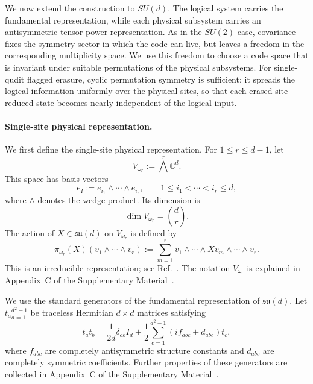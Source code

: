 \documentclass[10pt,twocolumn,superscriptaddress,aps,amsmath,amssymb,citeautoscript,floatfix,prx,longbibliography]{revtex4-2}
\theoremstyle{plain}
\theoremstyle{plain}
\theoremstyle{plain}
\theoremstyle{plain}
\theoremstyle{plain}
\theoremstyle{plain}
\begin{document}
We now extend the construction to $SU(d)$. The logical system carries the fundamental representation, while each physical subsystem carries an antisymmetric tensor-power representation. As in the $SU(2)$ case, covariance fixes the symmetry sector in which the code can live, but leaves a freedom in the corresponding multiplicity space. We use this freedom to choose a code space that is invariant under suitable permutations of the physical subsystems. For single-qudit flagged erasure, cyclic permutation symmetry is sufficient: it spreads the logical information uniformly over the physical sites, so that each erased-site reduced state becomes nearly independent of the logical input.

\paragraph{Single-site physical representation.}

We first define the single-site physical representation. For $1\le r\le d-1$, let
\begin{equation}\label{eq:vomegar_def}
V_{\omega_r}:=\bigwedge^r \mathbb C^d .
\end{equation}
This space has basis vectors
$$
e_I:=e_{i_1}\wedge\cdots\wedge e_{i_r},
\qquad
1\le i_1<\cdots<i_r\le d,
$$
where $\wedge$ denotes the wedge product. Its dimension is
$$
\dim V_{\omega_r}=\binom{d}{r}.
$$
The action of $X\in\mathfrak{su}(d)$ on $V_{\omega_r}$ is defined by
\begin{equation}\label{eq:sud_vomegar_def}
\pi_{\omega_r}(X)
\left(v_1\wedge\cdots\wedge v_r\right)
:=
\sum_{m=1}^r
v_1\wedge\cdots\wedge Xv_m\wedge\cdots\wedge v_r .
\end{equation}
This is an irreducible representation; see Ref.~\cite{FultonHarris1991}. The notation $V_{\omega_r}$ is explained in Appendix~C of the Supplementary Material~\cite{SuppMat}.

We use the standard generators of the fundamental representation of $\mathfrak{su}(d)$. Let ${t_a}_{a=1}^{d^2-1}$ be traceless Hermitian $d\times d$ matrices satisfying
\begin{equation}
t_a t_b
=
\frac{1}{2d}\delta_{ab}I_d
+
\frac12
\sum_{c=1}^{d^2-1}
\left(i f_{abc}+d_{abc}\right)t_c ,
\end{equation}
where $f_{abc}$ are completely antisymmetric structure constants and $d_{abc}$ are completely symmetric coefficients. Further properties of these generators are collected in Appendix~C of the Supplementary Material~\cite{SuppMat}.
\end{document}
